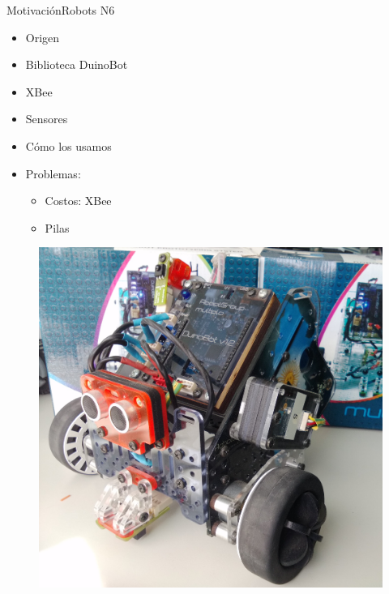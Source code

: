 \documentclass{beamer}
\begin{document}
\begin{frame}{Motivación}{Robots N6}
    \begin{minipage}[t]{0.7\linewidth}
        \begin{itemize}[<+->]
            \item Origen
            \item Biblioteca DuinoBot
            \item XBee
            \item Sensores
            \item Cómo los usamos
            \item Problemas:
                \begin{itemize}
                    \item Costos: XBee
                    \item Pilas
                \end{itemize}
        \end{itemize}
    \end{minipage}%
    \begin{minipage}[t]{0.3\linewidth}
        \begin{figure}
            \includegraphics[width=\linewidth]{images/n6}
        \end{figure}
    \end{minipage}
\end{frame}
\end{document}

